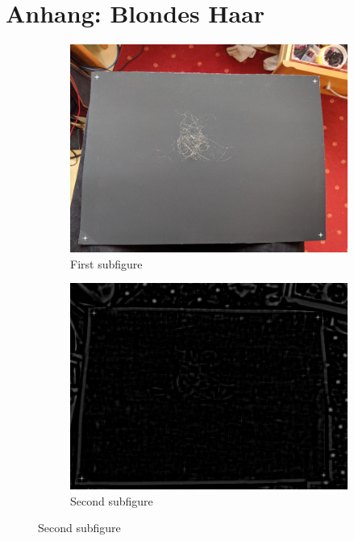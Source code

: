 \documentclass[german,a4paper, 12pt]{scrartcl}
\begin{document}
\section{Anhang: Blondes Haar}

\begin{figure}[H] %
	\begin{subfigure}{0.48\textwidth}
		\includegraphics[width=\linewidth]{figBina/01foundDots.png}
		\caption{First subfigure} \label{fig:a}
	\end{subfigure}\hspace*{\fill}
	\begin{subfigure}{0.48\textwidth}
		\includegraphics[width=\linewidth]{figBina/02revRes.png}
		\caption{Second subfigure} \label{fig:b}
	\end{subfigure}
	

\end{figure}
\end{document}
